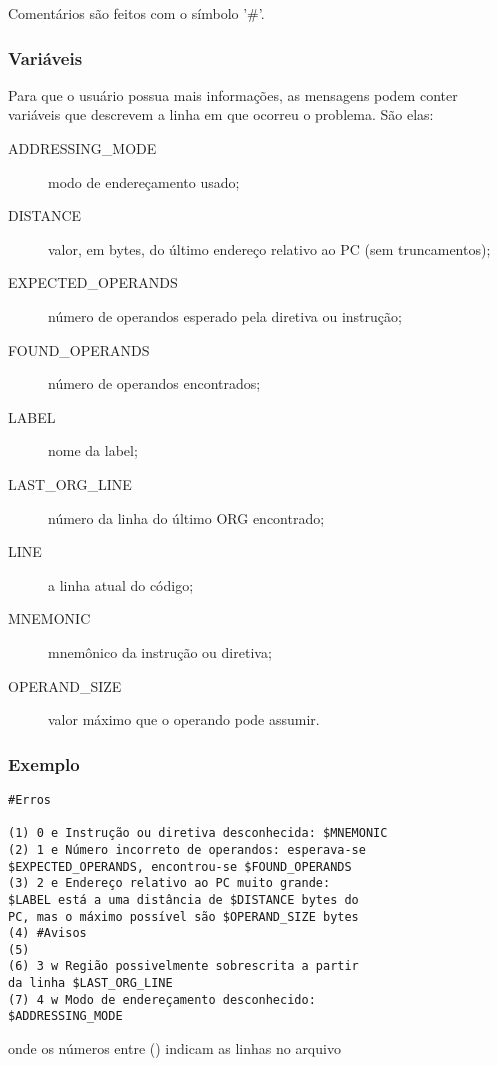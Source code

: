 \documentclass[a4paper,10pt]{article}
\begin{document}
		Comentários são feitos com o símbolo '\#'.
		
		\subsubsection{Variáveis}
			Para que o usuário possua mais informações, as mensagens podem conter variáveis que descrevem a linha em que ocorreu o problema. São elas:
			
			\begin{description}
				\item [ADDRESSING\_MODE] modo de endereçamento usado; 
				\item [DISTANCE] valor, em bytes, do último endereço relativo ao PC (sem truncamentos);
				\item [EXPECTED\_OPERANDS] número de operandos esperado pela diretiva ou instrução;
				\item [FOUND\_OPERANDS] número de operandos encontrados;
				\item [LABEL] nome da label;
				\item [LAST\_ORG\_LINE] número da linha do último ORG encontrado;
				\item [LINE] a linha atual do código;
				\item [MNEMONIC] mnemônico da instrução ou diretiva;
				\item [OPERAND\_SIZE] valor máximo que o operando pode assumir.
			\end{description}
	
	\subsubsection{Exemplo}
	\begin{lstlisting}
#Erros 

(1) 0 e Instrução ou diretiva desconhecida: $MNEMONIC 
(2) 1 e Número incorreto de operandos: esperava-se 
$EXPECTED_OPERANDS, encontrou-se $FOUND_OPERANDS 
(3) 2 e Endereço relativo ao PC muito grande: 
$LABEL está a uma distância de $DISTANCE bytes do
PC, mas o máximo possível são $OPERAND_SIZE bytes
(4) #Avisos
(5)
(6) 3 w Região possivelmente sobrescrita a partir
da linha $LAST_ORG_LINE
(7) 4 w Modo de endereçamento desconhecido: 
$ADDRESSING_MODE		 
	\end{lstlisting}
	
	onde os números entre {()} indicam as linhas no arquivo
\end{document}
